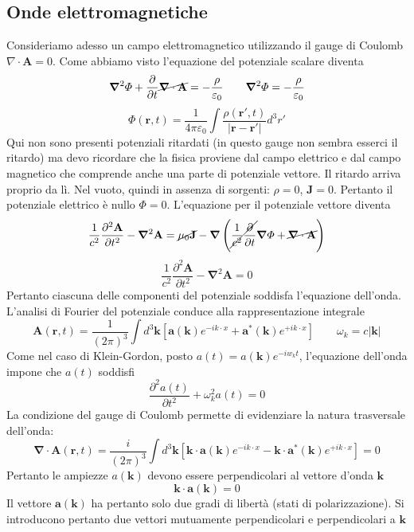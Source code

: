 \subsection{Onde elettromagnetiche}
Consideriamo adesso un campo elettromagnetico utilizzando il gauge di Coulomb $\nabla\cdot \mathbf{A}=0$. Come abbiamo visto l'equazione del potenziale scalare diventa
$$
\boldsymbol{\nabla}^2 \Phi + \frac{\partial}{\partial t} \cancel{\boldsymbol{\nabla} \cdot \mathbf{A}} = -\frac{\rho}{\varepsilon_0} \qquad \boldsymbol{\nabla}^2 \Phi = -\frac{\rho}{\varepsilon_0}
$$
$$
\Phi(\mathbf{r}, t) = \frac{1}{4\pi\varepsilon_0} \int \frac{\rho(\mathbf{r}', t)}{|\mathbf{r} - \mathbf{r}'|} d^3 r'
$$
Qui non sono presenti potenziali ritardati (in questo gauge non sembra esserci il ritardo) ma devo ricordare che la fisica proviene dal campo elettrico e dal campo magnetico che comprende anche una parte di potenziale vettore. Il ritardo arriva proprio da lì.
Nel vuoto, quindi in assenza di sorgenti: $\rho=0$, $\mathbf{J}=0$. Pertanto il potenziale elettrico è nullo $\Phi=0$. L'equazione per il potenziale vettore diventa
$$
\frac{1}{c^2} \frac{\partial^2 \mathbf{A}}{\partial t^2} - \boldsymbol{\nabla}^2 \mathbf{A} = \cancel{\mu_0 \mathbf{J}} - \boldsymbol{\nabla} \left(\cancel{\frac{1}{c^2} \frac{\partial}{\partial t}} \boldsymbol{\nabla}\Phi + \cancel{\boldsymbol{\nabla} \cdot \mathbf{A}} \right)
$$
$$
\frac{1}{c^2} \frac{\partial^2 \mathbf{A}}{\partial t^2} - \boldsymbol{\nabla}^2 \mathbf{A} = 0
$$
Pertanto ciascuna delle componenti del potenziale soddisfa l'equazione dell'onda. L'analisi di Fourier del potenziale conduce alla rappresentazione integrale
$$
\mathbf{A}(\mathbf{r}, t) = \frac{1}{(2\pi)^3} \int d^3\mathbf{k} [\mathbf{a}(\mathbf{k})e^{-ik\cdot x} + \mathbf{a}^*(\mathbf{k})e^{+ik\cdot x}] \qquad \omega_k = c|\mathbf{k}|
$$
Come nel caso di Klein-Gordon, posto $a(t)=a(\mathbf{k})e^{-iw_kt}$, l'equazione dell'onda impone che $a(t)$ soddisfi
$$
\frac{\partial^2 a(t)}{\partial t^2} + \omega_k^2 a(t) = 0
$$
La condizione del gauge di Coulomb permette di evidenziare la natura trasversale dell'onda:
$$
\boldsymbol{\nabla} \cdot \mathbf{A}(\mathbf{r}, t) = \frac{i}{(2\pi)^3} \int d^3\mathbf{k} [\mathbf{k} \cdot \mathbf{a}(\mathbf{k}) e^{-ik\cdot x} - \mathbf{k} \cdot \mathbf{a}^*(\mathbf{k}) e^{+ik\cdot x}] = 0
$$
Pertanto le ampiezze $a(\mathbf{k})$ devono essere perpendicolari al vettore d'onda $\mathbf{k}$
$$
\mathbf{k}\cdot\mathbf{a}(\mathbf{k})=0
$$
Il vettore $\mathbf{a}(\mathbf{k})$ ha pertanto solo due gradi di libertà (stati di polarizzazione). Si introducono pertanto due vettori mutuamente perpendicolari e perpendicolari a $\mathbf{k}$
